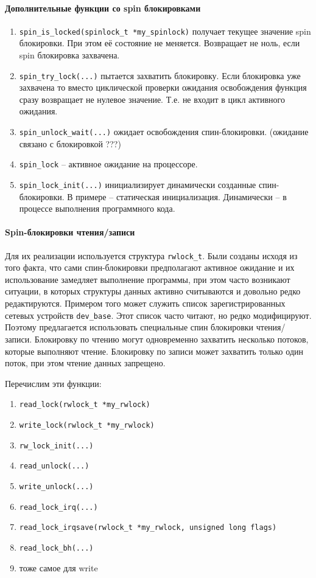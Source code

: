 \paragraph{Дополнительные функции со spin блокировками}
\begin{enumerate}
	\item \verb|spin_is_locked(spinlock_t *my_spinlock)| получает текущее значение spin блокировки. При этом её состояние не меняется. Возвращает не ноль, если spin блокировка захвачена. 
	\item \verb|spin_try_lock(...)| пытается захватить блокировку. Если блокировка уже захвачена то вместо циклической проверки ожидания освобождения функция сразу возвращает не нулевое значение. Т.е. не входит в цикл активного ожидания.
	\item \verb|spin_unlock_wait(...)|  ожидает освобождения спин-блокировки. (ожидание связано с блокировкой ???)
	\item \verb|spin_lock| – активное ожидание на процессоре.
	\item \verb|spin_lock_init(...)| инициализирует динамически созданные спин-блокировки. В примере – статическая инициализация. Динамически – в процессе выполнения программного кода. 
\end{enumerate} 

\paragraph{Spin-блокировки чтения/записи}

Для их реализации используется структура \verb|rwlock_t|. Были созданы исходя из того факта, что сами спин-блокировки предполагают активное ожидание и их использование замедляет выполнение программы, при этом часто возникают ситуации, в которых структуры данных активно считываются и довольно редко редактируются.  Примером того может служить список зарегистрированных сетевых устройств \verb|dev_base|. Этот список часто читают, но редко модифицируют. Поэтому предлагается использовать специальные спин блокировки чтения/записи. Блокировку по чтению могут одновременно захватить несколько потоков, которые выполняют чтение. Блокировку по записи может захватить только один поток, при этом чтение данных запрещено. 

Перечислим эти функции:
\begin{enumerate}
	\item \verb|read_lock(rwlock_t *my_rwlock)|
	\item \verb|write_lock(rwlock_t *my_rwlock)|
	\item \verb|rw_lock_init(...)|
	\item \verb|read_unlock(...)|
	\item \verb|write_unlock(...)|
	\item \verb|read_lock_irq(...)|
	\item \verb|read_lock_irqsave(rwlock_t *my_rwlock, unsigned long flags)|
	\item \verb|read_lock_bh(...)|
	\item тоже самое для write
\end{enumerate}

